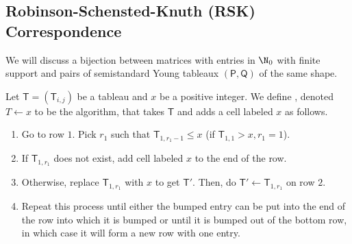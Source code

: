 \documentclass[11pt,leqno,oneside]{amsart}
\numberwithin{thm}{section}
\newcommand{\T}{\mathsf{T}} %
\newcommand{\TP}{\mathsf{P}}
\newcommand{\TQ}{\mathsf{Q}}
\begin{document}
\subsection{Robinson-Schensted-Knuth (RSK) Correspondence}
We will discuss a bijection between matrices with entries in \(\N_0\)
with finite support and pairs of semistandard Young tableaux \((\TP,
\TQ)\) of the same shape. 
\begin{defn}
  Let \(\T = (\T_{i,j})\) be a tableau and \(x\) be a positive
  integer. We define 
  , denoted \(T \leftarrow x\) to be the algorithm,
  that takes \(\T\) and adds a cell labeled \(x\) as follows.
  \begin{enumerate}[label=(\arabic*)]
  \item Go to row \(1\). Pick \(r_1\) such that \(\T_{1,r_1-1} \leq x\)
    (if \(\T_{1,1} > x, r_1=1\)).
  \item If \(\T_{1,r_1}\) does not exist, add
    cell labeled \(x\) to the end of the row.
  \item Otherwise, replace \(\T_{1,r_1}\) with \(x\) to get
    \(\T'\). Then, do \(\T' \leftarrow \T_{1,r_1}\) on row \(2\).
  \item Repeat this process until either the bumped entry can be put
    into the end of the row into which it is bumped or until it is
    bumped out of the bottom row, in which case it will form a new row
    with one entry. 
  \end{enumerate}
\end{defn}
\end{document}

